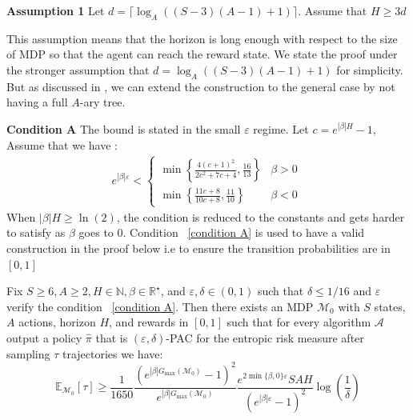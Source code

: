 \documentclass[final,12pt]{colt2026} %
\begin{document}
\noindent \textbf{Assumption 1} Let $d = \lceil \log_{A}((S - 3)(A - 1) + 1) \rceil$. Assume that $H \geq 3d$

This assumption means that the horizon is long enough with respect to the size of MDP so that the agent can reach the reward state. We state the proof under the stronger assumption that $d = \log_{A}((S - 3)(A - 1) + 1)$ for simplicity. But as discussed in \citep{domingues2021episodic}, we can extend the construction to the general case by not having a full $A$-ary tree.

\noindent \textbf{Condition A} The bound is stated in the small $\varepsilon$ regime. Let $c = e^{|\beta| H} - 1$, Assume that we have :
\begin{align}\label{condition A}
e^{|\beta|\varepsilon}< \begin{cases}
\min\left\{\frac{4(c+1)^2}{2c^2+7c+4},\frac{16}{13}\right\} & \beta>0\\[10pt]
\min\left\{\frac{11c+8}{10c+8},\frac{11}{10}\right\} & \beta<0~
\end{cases}
\end{align}
When $|\beta|H \geq \ln(2)$, the condition is reduced to the constants and gets harder to satisfy as $\beta$ goes to $0$. Condition ~\ref{condition A} is used to have a valid construction in the proof below i.e to ensure the transition probabilities are in $[0,1]$
\begingroup
\renewcommand\thetheorem{\ref{th:lower_bound_theorem}}
\begin{theorem}
Fix $S \geq 6, A \geq 2, H \in \mathbb{N}, \beta \in \mathbb{R}^\star$, and $\varepsilon, \delta \in (0, 1)$ such that $\delta \leq 1/16$ and $\varepsilon$ verify the condition ~\eqref{condition A}. Then there exists an MDP $\mathcal{M}_0$ with $S$ states, $A$ actions, horizon $H$, and rewards in $[0, 1]$ such that for every algorithm $\mathcal{A}$ output a policy $\hat{\pi}$ that is $(\varepsilon, \delta)$-PAC for the entropic risk measure after sampling $\tau$ trajectories we have: 
$$\mathbb{E}_{\mathcal{M}_0}[\tau] \geq \frac{1}{1650} \frac{(e^{|\beta| G_{\max}(\mathcal{M}_0)} - 1)^2}{e^{|\beta| G_{\max}(\mathcal{M}_0)}} \frac{e^{2\min \{\beta,0\}\varepsilon}SAH}{(e^{|\beta| \varepsilon} - 1)^2} \log \left( \frac{1}{\delta} \right)$$
\end{theorem}
\endgroup 
\end{document}
